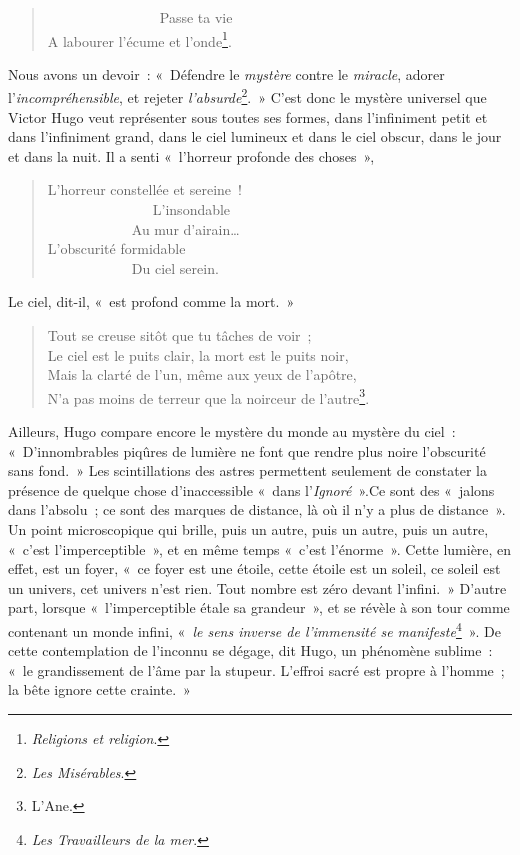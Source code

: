 \documentclass[french,twoside]{book} %
\begin{document}
\begin{verse}
                Passe ta vie\\
A labourer l’écume et l’onde\footnote{\emph{Religions et religion}.}.\\
\end{verse}

\noindent Nous avons un devoir : « Défendre le \emph{mystère} contre le \emph{miracle}, adorer l’\emph{incompréhensible}, et rejeter \emph{l’absurde}\footnote{\emph{Les Misérables}.}. » C’est donc le mystère universel que Victor Hugo veut représenter sous toutes ses formes, dans l’infiniment petit et dans l’infiniment grand, dans le ciel lumineux et dans le ciel obscur, dans le jour et dans la nuit. Il a senti « l’horreur profonde des choses »,\par


\begin{verse}
L’horreur constellée et sereine !\\
               L’insondable\\
            Au mur d’airain…\\
L’obscurité formidable\\
            Du ciel serein.\\
\end{verse}

\noindent Le ciel, dit-il, « est profond comme la mort. »\par


\begin{verse}
Tout se creuse sitôt que tu tâches de voir ;\\
Le ciel est le puits clair, la mort est le puits noir,\\
Mais la clarté de l’un, même aux yeux de l’apôtre,\\
N’a pas moins de terreur que la noirceur de l’autre\footnote{L’Ane.}.\\
\end{verse}

\noindent Ailleurs, Hugo compare encore le mystère du monde au mystère du ciel : « D’innombrables piqûres de lumière ne font que rendre plus noire l’obscurité sans fond. » Les scintillations des astres permettent seulement de constater la présence de quelque chose d’inaccessible « dans l’\emph{Ignoré} ».Ce sont des « jalons dans l’absolu ; ce sont des marques de distance, là où il n’y a plus de distance ». Un point microscopique qui brille, puis un autre, puis un autre, puis un autre, « c’est l’imperceptible », et en même temps « c’est l’énorme ». Cette lumière, en effet, est un foyer, « ce foyer est une étoile, cette étoile est un soleil, ce soleil est un univers, cet univers n’est rien. Tout nombre est zéro devant l’infini. » D’autre part, lorsque « l’imperceptible étale sa grandeur », et se révèle à son tour comme contenant un monde infini, « \emph{le sens inverse de l’immensité se manifeste}\footnote{\emph{Les Travailleurs de la mer}.} ». De cette contemplation de l’inconnu se dégage, dit Hugo, un phénomène sublime : « le grandissement de l’âme par la stupeur. L’effroi sacré est propre à l’homme ; la bête ignore cette crainte. »\par
\end{document}
